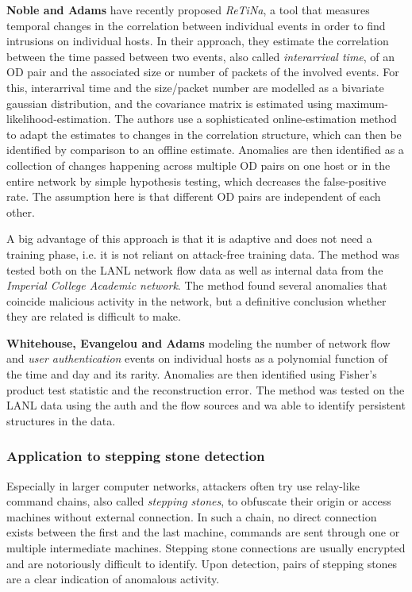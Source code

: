 \documentclass[a4paper,12pt,twoside]{report}
\begin{document}
\textbf{Noble and Adams} \cite{noble_real-time_2018, noble_correlation-based_2016} have recently proposed \textit{ReTiNa}, a tool that measures temporal changes in the correlation between individual events in order to find intrusions on individual hosts. In their approach, they estimate the correlation between the time passed between two events, also called \textit{interarrival time}, of an OD pair and the associated size or number of packets of the involved events. For this, interarrival time and the size/packet number are modelled as a bivariate gaussian distribution, and the covariance matrix is estimated using maximum-likelihood-estimation. The authors use a sophisticated online-estimation method to adapt the estimates to changes in the correlation structure, which can then be identified by comparison to an offline estimate. Anomalies are then identified as a collection of changes happening across multiple OD pairs on one host or in the entire network by simple hypothesis testing, which decreases the false-positive rate. The assumption here is that different OD pairs are independent of each other.


A big advantage of this approach is that it is adaptive and does not need a training phase, i.e. it is not reliant on attack-free training data. The method was tested both on the LANL network flow data as well as internal data from the \textit{Imperial College Academic network}. The method found several anomalies that coincide malicious activity in the network, but a definitive conclusion whether they are related is difficult to make.

\textbf{Whitehouse, Evangelou and Adams} \cite{whitehouse_activity-based_2016} modeling the number of 
network flow and \textit{user authentication} events on individual hosts as a polynomial function of the time and day and its rarity. Anomalies are then identified using Fisher's product test statistic and the reconstruction error. The method was tested on the LANL data using the auth and the flow sources and wa able to identify persistent structures in the data. 


\subsubsection*{Application to stepping stone detection}

Especially in larger computer networks, attackers often try use relay-like command chains, also called \textit{stepping stones}, to obfuscate their origin or access machines without external connection. In such a chain, no direct connection exists between the first and the last machine, commands are sent through one or multiple intermediate machines. Stepping stone connections are usually encrypted and are notoriously difficult to identify. Upon detection, pairs of stepping stones are a clear indication of anomalous activity. 
\end{document}
